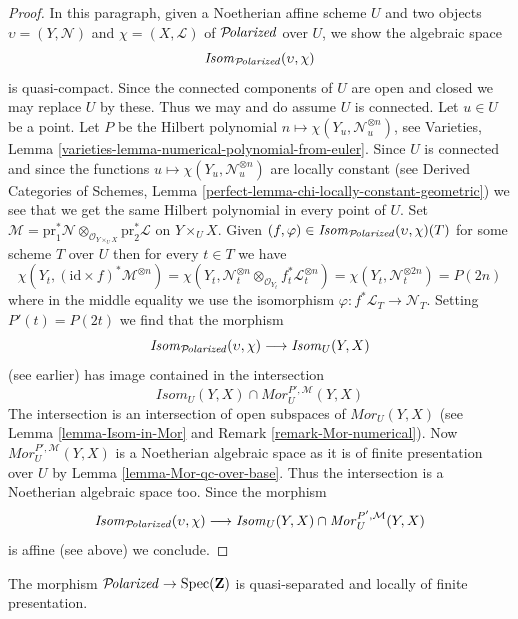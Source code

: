 \begin{proof}
\medskip\noindent
In this paragraph, given a Noetherian affine scheme $U$ and two objects
$\upsilon = (Y, \mathcal{N})$ and $\chi = (X, \mathcal{L})$
of $\mathcal{P}\!\mathit{olarized}$ over $U$, we show the algebraic space
$$
\mathit{Isom}_{\mathcal{P}\!\mathit{olarized}}(\upsilon, \chi)
$$
is quasi-compact. Since the connected components of $U$ are open and closed
we may replace $U$ by these. Thus we may and do assume $U$ is connected.
Let $u \in U$ be a point. Let $P$ be the Hilbert polynomial
$n \mapsto \chi(Y_u, \mathcal{N}_u^{\otimes n})$, see
Varieties, Lemma \ref{varieties-lemma-numerical-polynomial-from-euler}.
Since $U$ is connected and since
the functions $u \mapsto \chi(Y_u, \mathcal{N}_u^{\otimes n})$
are locally constant (see 
Derived Categories of Schemes, Lemma
\ref{perfect-lemma-chi-locally-constant-geometric})
we see that we get the same Hilbert polynomial in every point of $U$.
Set
$\mathcal{M} = \text{pr}_1^*\mathcal{N}
\otimes_{\mathcal{O}_{Y \times_U X}} \text{pr}_2^*\mathcal{L}$
on $Y \times_U X$. Given
$(f, \varphi) \in \mathit{Isom}_{\mathcal{P}\!\mathit{olarized}}(\upsilon, \chi)(T)$
for some scheme $T$ over $U$ then for every $t \in T$ we have
$$
\chi(Y_t, (\text{id} \times f)^*\mathcal{M}^{\otimes n}) =
\chi(Y_t,
\mathcal{N}_t^{\otimes n} \otimes_{\mathcal{O}_{Y_t}}
f_t^*\mathcal{L}_t^{\otimes n}) =
\chi(Y_t, \mathcal{N}_t^{\otimes 2n}) = P(2n)
$$
where in the middle equality we use the isomorphism
$\varphi : f^*\mathcal{L}_T \to \mathcal{N}_T$.
Setting $P'(t) = P(2t)$ we find that the morphism
$$
\mathit{Isom}_{\mathcal{P}\!\mathit{olarized}}(\upsilon, \chi)
\longrightarrow
\mathit{Isom}_U(Y, X)
$$
(see earlier) has image contained in the intersection
$$
\mathit{Isom}_U(Y, X) \cap \mathit{Mor}^{P', \mathcal{M}}_U(Y, X)
$$
The intersection is an intersection of open subspaces of
$\mathit{Mor}_U(Y, X)$ (see Lemma \ref{lemma-Isom-in-Mor} and
Remark \ref{remark-Mor-numerical}).
Now $\mathit{Mor}^{P', \mathcal{M}}_U(Y, X)$
is a Noetherian algebraic space as it is of finite
presentation over $U$ by Lemma \ref{lemma-Mor-qc-over-base}.
Thus the intersection
is a Noetherian algebraic space too. Since the morphism
$$
\mathit{Isom}_{\mathcal{P}\!\mathit{olarized}}(\upsilon, \chi)
\longrightarrow
\mathit{Isom}_U(Y, X) \cap \mathit{Mor}^{P', \mathcal{M}}_U(Y, X)
$$
is affine (see above) we conclude.
\end{proof}

\begin{lemma}
\label{lemma-polarized-qs-lfp}
The morphism $\mathcal{P}\!\mathit{olarized} \to \mathop{\mathrm{Spec}}(\mathbf{Z})$ is quasi-separated and
locally of finite presentation.
\end{lemma}

